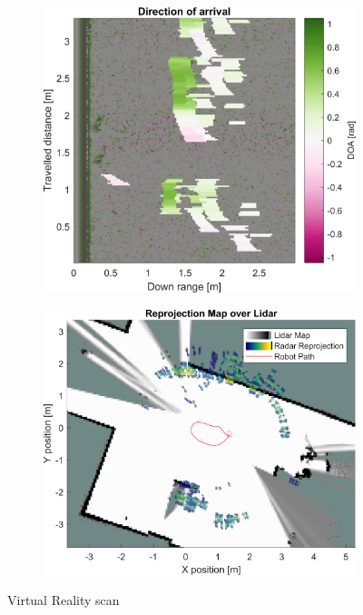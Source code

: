 \begin{figure}[htbp]
\begin{subfigure}[t]{0.475\linewidth}
    \end{subfigure}\bigskip\\
    \begin{subfigure}[t]{0.475\linewidth}  
        \centering 
        \includegraphics[width=\linewidth,max height=.475\textheight]{gfx/results/virtualreality_doa.png}
    \end{subfigure}%
    \hfill%
    \begin{subfigure}[t]{0.475\linewidth}   
        \centering 
        \includegraphics[width=\linewidth,max height=.475\textheight]{gfx/results/virtualreality_map.png}
    \end{subfigure}%
    \caption{Virtual Reality scan}
\end{figure}

